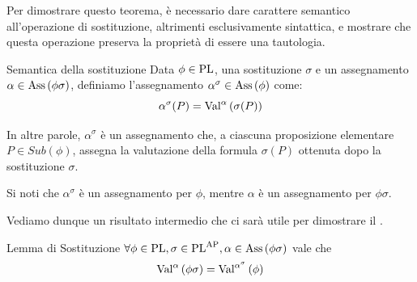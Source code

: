 Per dimostrare questo teorema, è necessario dare carattere semantico all'operazione di sostituzione, altrimenti esclusivamente sintattica, e mostrare che questa operazione preserva la proprietà di essere una tautologia.

\begin{definition}{Semantica della sostituzione}
  Data \(\phi \in \operatorname{PL}\), una sostituzione \(\sigma\) e un assegnamento \(\alpha \in \operatorname{Ass}\left(\phi\sigma\right)\), definiamo l'assegnamento \(\alpha^\sigma \in \operatorname{Ass}\left(\phi\right)\) come:
  \[\alpha^\sigma(P)=\Val{\alpha}[\sigma(P)]\]
\end{definition}

In altre parole, \(\alpha^{\sigma}\) è un assegnamento che, a ciascuna proposizione elementare \(P\in Sub(\phi)\), assegna la valutazione della formula \(\sigma(P)\) ottenuta dopo la sostituzione \(\sigma\).

\begin{note}{}
  Si noti che \(\alpha^\sigma\) è un assegnamento per \(\phi\), mentre \(\alpha\) è un assegnamento per \(\phi\sigma\).
\end{note}

Vediamo dunque un risultato intermedio che ci sarà utile per dimostrare il .
\begin{lemma}[namedlabel={lem:substitution}{Lemma di Sostituzione}]{Lemma di Sostituzione}
  \(\forall \phi \in \PL, \sigma \in \PL^{\AP}, \alpha \in \Ass{\phi\sigma}\) vale che
  \[\Val{\alpha}[\phi\sigma]=\Val{\alpha^\sigma}[\phi]\]
\end{lemma}

